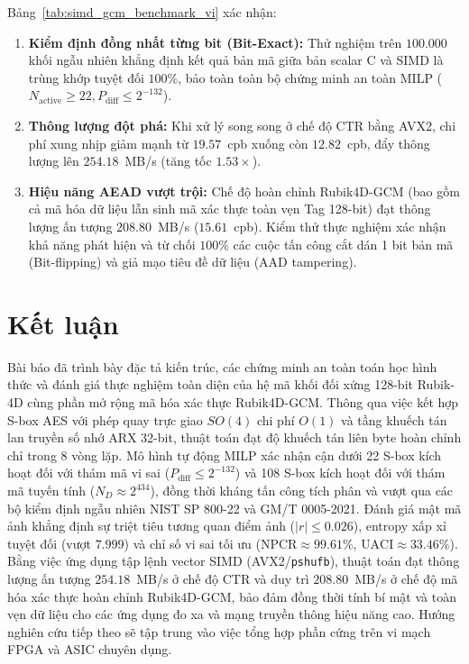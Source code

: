 \documentclass[10pt,twocolumn]{article}
\begin{document}
Bảng~\ref{tab:simd_gcm_benchmark_vi} xác nhận:
\begin{enumerate}
    \item \textbf{Kiểm định đồng nhất từng bit (Bit-Exact):} Thử nghiệm trên $100.000$ khối ngẫu nhiên khẳng định kết quả bản mã giữa bản scalar C và SIMD là trùng khớp tuyệt đối $100\%$, bảo toàn toàn bộ chứng minh an toàn MILP ($N_{\text{active}} \ge 22, P_{\text{diff}} \le 2^{-132}$).
    \item \textbf{Thông lượng đột phá:} Khi xử lý song song ở chế độ CTR bằng AVX2, chi phí xung nhịp giảm mạnh từ $19.57$~cpb xuống còn $12.82$~cpb, đẩy thông lượng lên $254.18$~MB/s (tăng tốc $1.53\times$).
    \item \textbf{Hiệu năng AEAD vượt trội:} Chế độ hoàn chỉnh Rubik4D-GCM (bao gồm cả mã hóa dữ liệu lẫn sinh mã xác thực toàn vẹn Tag 128-bit) đạt thông lượng ấn tượng $208.80$~MB/s ($15.61$~cpb). Kiểm thử thực nghiệm xác nhận khả năng phát hiện và từ chối $100\%$ các cuộc tấn công cắt dán 1 bit bản mã (Bit-flipping) và giả mạo tiêu đề dữ liệu (AAD tampering).
\end{enumerate}

\section{Kết luận}
\label{sec:conclusion}
Bài báo đã trình bày đặc tả kiến trúc, các chứng minh an toàn toán học hình thức và đánh giá thực nghiệm toàn diện của hệ mã khối đối xứng 128-bit Rubik-4D cùng phần mở rộng mã hóa xác thực Rubik4D-GCM. Thông qua việc kết hợp S-box AES với phép quay trực giao $SO(4)$ chi phí $O(1)$ và tầng khuếch tán lan truyền số nhớ ARX 32-bit, thuật toán đạt độ khuếch tán liên byte hoàn chỉnh chỉ trong 8 vòng lặp. Mô hình tự động MILP xác nhận cận dưới 22 S-box kích hoạt đối với thám mã vi sai ($P_{\text{diff}} \le 2^{-132}$) và 108 S-box kích hoạt đối với thám mã tuyến tính ($N_D \approx 2^{434}$), đồng thời kháng tấn công tích phân và vượt qua các bộ kiểm định ngẫu nhiên NIST SP 800-22 và GM/T 0005-2021. Đánh giá mật mã ảnh khẳng định sự triệt tiêu tương quan điểm ảnh ($|r| \le 0.026$), entropy xấp xỉ tuyệt đối (vượt $7.999$) và chỉ số vi sai tối ưu ($\text{NPCR} \approx 99.61\%$, $\text{UACI} \approx 33.46\%$). Bằng việc ứng dụng tập lệnh vector SIMD (AVX2/\texttt{pshufb}), thuật toán đạt thông lượng ấn tượng $254.18$~MB/s ở chế độ CTR và duy trì $208.80$~MB/s ở chế độ mã hóa xác thực hoàn chỉnh Rubik4D-GCM, bảo đảm đồng thời tính bí mật và toàn vẹn dữ liệu cho các ứng dụng đo xa và mạng truyền thông hiệu năng cao. Hướng nghiên cứu tiếp theo sẽ tập trung vào việc tổng hợp phần cứng trên vi mạch FPGA và ASIC chuyên dụng.
\end{document}
